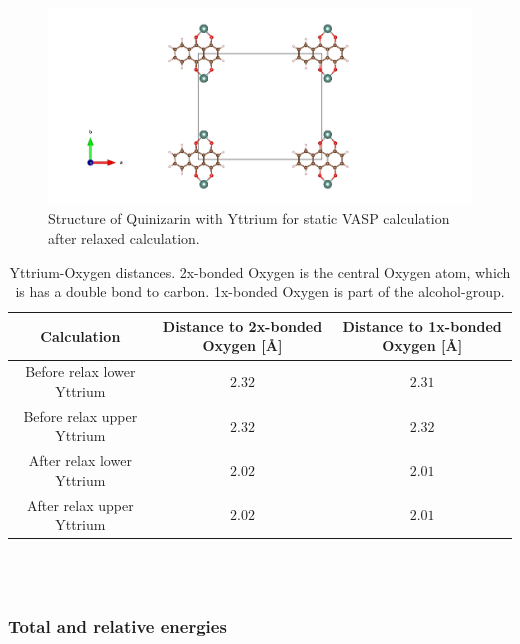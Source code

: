 \documentclass{article}
\begin{document}
      \begin{figure}[H]
        \centering
        \includegraphics[width = \textwidth]{../fig/Y_staticafter_CONTCAR.png}
        \caption{Structure of Quinizarin with Yttrium for static VASP   calculation after relaxed calculation. }
        \label{fig:Y_staticafter_CONTCAR}
      \end{figure}

      \begin{table}[H]
        \centering
        \caption{Yttrium-Oxygen distances. 2x-bonded Oxygen is the central Oxygen atom, which is has a double bond to carbon. 1x-bonded Oxygen is part of the alcohol-group. }
        \label{tab:neighborY}
        \begin{tabular}{|c|c|c|}
            \hline
            Calculation & Distance to 2x-bonded Oxygen [Å] & Distance to 1x-bonded Oxygen [Å]  \\
            \hline \hline
            Before relax lower Yttrium & $2.32$ & $2.31$ \\
            Before relax upper Yttrium & $2.32$ & $2.32$ \\
            After relax lower Yttrium & $2.02$ & $2.01$ \\
            After relax upper Yttrium & $2.02$ & $2.01$ \\
            \hline
        \end{tabular} \\
        \hspace{0pt}\\
      \end{table}

      \vspace{1cm}

    \subsubsection{Total and relative energies}
\end{document}

